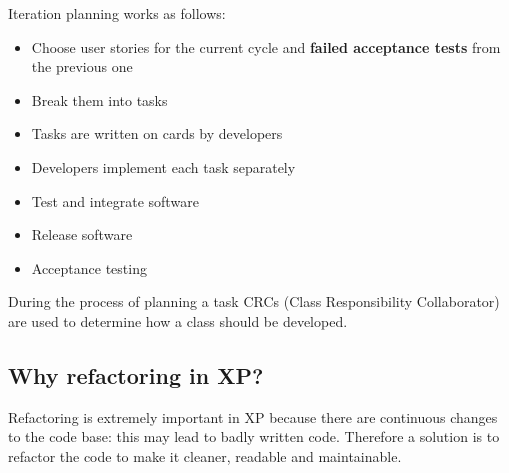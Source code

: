 \documentclass{article}
\begin{document}
	Iteration planning works as follows:
	\begin{itemize}
		\item Choose user stories for the current cycle and \textbf{failed acceptance tests} from the previous one 
		\item Break them into tasks
		\item Tasks are written on cards by developers
		\item Developers implement each task separately
		\item Test and integrate software
		\item Release software
		\item Acceptance testing
	\end{itemize}
	
	During the process of planning a task CRCs (Class Responsibility Collaborator) are used to determine
	how a class should be developed.
	
	\subsection*{Why refactoring in XP?}
	Refactoring is extremely important in XP because there are continuous changes to the code base: this may
	lead to badly written code. Therefore a solution is to refactor the code to make it cleaner, readable
	and maintainable.
		
\end{document}
